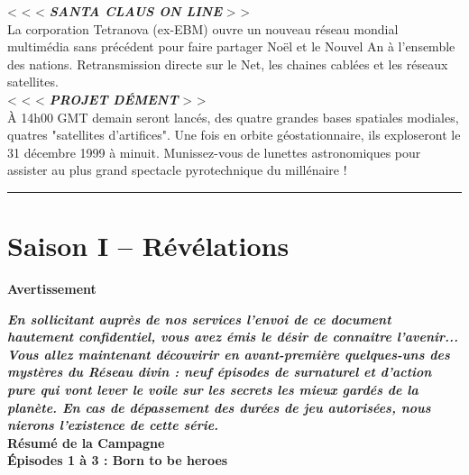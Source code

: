 \documentclass[11pt,twoside,a4paper]{book}
\begin{document}
< < <  \textbf{\textit{SANTA CLAUS ON LINE}} > >~\\
La corporation Tetranova (ex-EBM) ouvre un nouveau r{\'e}seau mondial multim{\'e}dia sans pr{\'e}c{\'e}dent pour faire partager No{\"e}l et le Nouvel An {\`a} l'ensemble des nations. Retransmission directe sur le Net, les chaines cabl{\'e}es et les r{\'e}seaux satellites.~\\
< < <  \textbf{\textit{PROJET D{\'E}MENT}} > >~\\
{\`A} 14h00 GMT demain seront lanc{\'e}s, des quatre grandes bases spatiales modiales, quatres "satellites d'artifices". Une fois en orbite g{\'e}ostationnaire, ils exploseront le 31 d{\'e}cembre 1999 {\`a} minuit. Munissez-vous de lunettes astronomiques pour assister au plus grand spectacle pyrotechnique du mill{\'e}naire !~\\ 

\hrule

\clearpage

\chapter*{Saison I -- R{\'e}v{\'e}lations}

\textbf{\LARGE Avertissement}

\textbf{\emph{\footnotesize En sollicitant aupr{\`e}s de nos services l'envoi de ce document hautement confidentiel, vous avez {\'e}mis le d{\'e}sir de connaitre l'avenir... Vous allez maintenant d{\'e}couvirir en avant-premi{\`e}re quelques-uns des myst{\`e}res du R{\'e}seau divin : neuf {\'e}pisodes de surnaturel et d'action pure qui vont lever le voile sur les secrets les mieux gard{\'e}s de la plan{\`e}te. En cas de d{\'e}passement des dur{\'e}es de jeu autoris{\'e}es, nous nierons l'existence de cette s{\'e}rie. } }~\\

\textbf{\Large R{\'e}sum{\'e} de la Campagne}~\\

\textbf{\large {\'E}pisodes 1 {\`a} 3 : Born to be heroes}~\\
\end{document}
